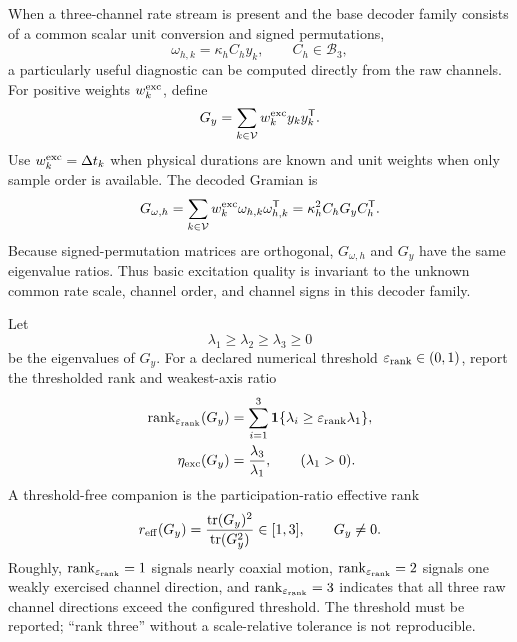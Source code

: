 \documentclass[11pt]{article}
\begin{document}
    When a three-channel rate stream is present and the base decoder family consists of a
    common scalar unit conversion and signed permutations,
    \begin{equation}
        \omega_{h,k}=\kappa_h C_h y_k,
        \qquad C_h\in\mathcal B_3,
    \end{equation}
    a particularly useful diagnostic can be computed directly from the raw channels. For
    positive weights $w_k^{\rm exc}$, define
    \begin{equation}
        G_y=\sum_{k\in\mathcal V}w_k^{\rm exc}y_k y_k^{\mathsf T}.
        \label{eq:raw-rate-gramian}
    \end{equation}
    Use $w_k^{\rm exc}=\Delta t_k$ when physical durations are known and unit weights when
    only sample order is available. The decoded Gramian is
    \begin{equation}
        G_{\omega,h}
        =\sum_{k\in\mathcal V}w_k^{\rm exc}\omega_{h,k}\omega_{h,k}^{\mathsf T}
        =\kappa_h^2 C_hG_yC_h^{\mathsf T}.
        \label{eq:decoded-rate-gramian}
    \end{equation}
    Because signed-permutation matrices are orthogonal, $G_{\omega,h}$ and $G_y$ have the
    same eigenvalue ratios. Thus basic excitation quality is invariant to the unknown
    common rate scale, channel order, and channel signs in this decoder family.

    Let
    \begin{equation}
        \lambda_1\ge\lambda_2\ge\lambda_3\ge0
    \end{equation}
    be the eigenvalues of $G_y$. For a declared numerical threshold
    $\varepsilon_{\rm rank}\in(0,1)$, report the thresholded rank and weakest-axis ratio
    \begin{align}
        \operatorname{rank}_{\varepsilon_{\rm rank}}(G_y)
        &=\sum_{i=1}^{3}\mathbf 1\{\lambda_i\ge
        \varepsilon_{\rm rank}\lambda_1\},\\
        \eta_{\rm exc}(G_y)&=\frac{\lambda_3}{\lambda_1},
        \qquad (\lambda_1>0).
        \label{eq:excitation-rank-ratio}
    \end{align}
    A threshold-free companion is the participation-ratio effective rank
    \begin{equation}
        r_{\rm eff}(G_y)
        =\frac{\operatorname{tr}(G_y)^2}{\operatorname{tr}(G_y^2)}\in[1,3],
        \qquad G_y\ne0.
        \label{eq:excitation-effective-rank}
    \end{equation}
    Roughly, $\operatorname{rank}_{\varepsilon_{\rm rank}}=1$ signals nearly coaxial motion, $\operatorname{rank}_{\varepsilon_{\rm rank}}=2$ signals
    one weakly exercised channel direction, and $\operatorname{rank}_{\varepsilon_{\rm rank}}=3$ indicates that all three
    raw channel directions exceed the configured threshold. The threshold must be reported;
    ``rank three'' without a scale-relative tolerance is not reproducible.
\end{document}
